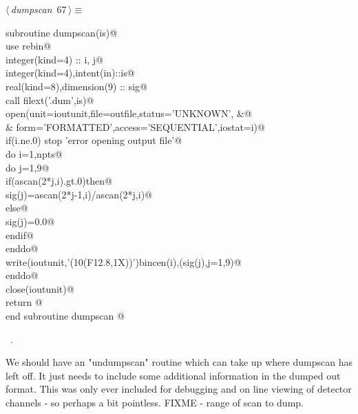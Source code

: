\documentclass[10pt,a4paper,notitlepage]{article}
\begin{document}
\begin{flushleft} \small
\begin{minipage}{\linewidth}\label{scrap71}\raggedright\small
{} $\langle\,${\it dumpscan}\nobreak\ {\footnotesize {67}}$\,\rangle\equiv$
\vspace{-1ex}
\begin{list}{}{} \item
\mbox{}\verb@      subroutine dumpscan(is)@\\
\mbox{}\verb@      use rebin@\\
\mbox{}\verb@      integer(kind=4) :: i, j@\\
\mbox{}\verb@      integer(kind=4),intent(in)::is@\\
\mbox{}\verb@      real(kind=8),dimension(9) :: sig@\\
\mbox{}\verb@      call filext('.dum',is)@\\
\mbox{}\verb@      open(unit=ioutunit,file=outfile,status='UNKNOWN',                 &@\\
\mbox{}\verb@     & form='FORMATTED',access='SEQUENTIAL',iostat=i)@\\
\mbox{}\verb@      if(i.ne.0) stop 'error opening output file'@\\
\mbox{}\verb@      do i=1,npts@\\
\mbox{}\verb@        do j=1,9@\\
\mbox{}\verb@          if(ascan(2*j,i).gt.0)then@\\
\mbox{}\verb@            sig(j)=ascan(2*j-1,i)/ascan(2*j,i)@\\
\mbox{}\verb@          else@\\
\mbox{}\verb@             sig(j)=0.0@\\
\mbox{}\verb@          endif@\\
\mbox{}\verb@        enddo@\\
\mbox{}\verb@        write(ioutunit,'(10(F12.8,1X))')bincen(i),(sig(j),j=1,9)@\\
\mbox{}\verb@      enddo@\\
\mbox{}\verb@      close(ioutunit)@\\
\mbox{}\verb@      return  @\\
\mbox{}\verb@      end subroutine dumpscan                                                @{\NWsep}
\end{list}
\vspace{-1.5ex}
\footnotesize
\begin{list}{}{\setlength{\itemsep}{-\parsep}\setlength{\itemindent}{-\leftmargin}}
\item \NWtxtMacroRefIn\ .

\item{}
\end{list}
\end{minipage}\vspace{4ex}
\end{flushleft}
We should have an "undumpscan" routine which can take up where
dumpscan has left off. It just needs to include some additional information
in the dumped out format. This was only ever included for debugging and
on line viewing of detector channels - so perhaps a bit pointless.
FIXME - range of scan to dump.
\end{document}
